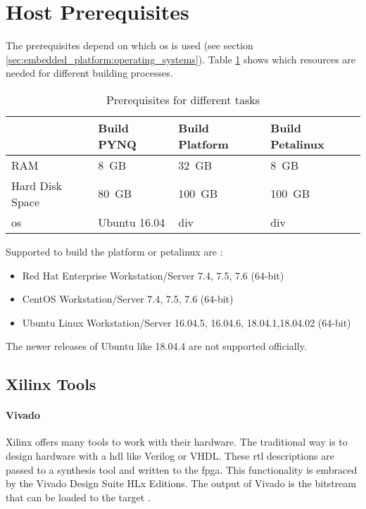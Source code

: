 \section{Host Prerequisites}
\label{sec:embedded_platform:host_prerequisites}

The prerequisites depend on which \acrshort{os} is used (see section \ref{sec:embedded_platform:operating_systems}).
Table \ref{tab:prerequisits_hardware} shows which resources are needed for different building processes. 

\begin{table}[hb]
  \caption{Prerequisites for different tasks}
  \label{tab:prerequisits_hardware}
  \centering
  \begin{tabular}{llll} %
    \toprule
    \textbf{} & \textbf{Build PYNQ} \cite{avnet_pynq_github} & \textbf{Build Platform} \cite{vitis_user_guide} & \textbf{Build Petalinux} \cite{petalinux_user_guide} \\ %
    \midrule
    RAM & \SI{8}{GB} & \SI{32}{GB} & \SI{8}{GB} \\ %
    Hard Disk Space & \SI{80}{GB} & \SI{100}{GB} & \SI{100}{GB} \\ %
    \acrlong{os} & Ubuntu 16.04 & div & div \\ %
    \bottomrule
  \end{tabular}
\end{table}

Supported  to build the platform or petalinux are \cite{vitis_user_guide} \cite{petalinux_user_guide}:
\begin{itemize}
  \item Red Hat Enterprise Workstation/Server 7.4, 7.5, 7.6 (64-bit)
  \item CentOS Workstation/Server 7.4, 7.5, 7.6 (64-bit)
  \item Ubuntu Linux Workstation/Server 16.04.5, 16.04.6, 18.04.1,18.04.02 (64-bit)
\end{itemize}
The newer releases of Ubuntu like 18.04.4 are not supported officially.

\subsection{Xilinx Tools}
\paragraph{Vivado}
\label{subsec:embedded_platform:host_prerequisites:xilinx_tools}
Xilinx offers many tools to work with their hardware.
The traditional way is to design hardware with a \acrfull{hdl} like Verilog or VHDL.
These \acrfull{rtl} descriptions are passed to a synthesis tool and written to the \acrshort{fpga}.
This functionality is embraced by the Vivado Design Suite HLx Editions.
The output of Vivado is the bitstream that can be loaded to the target \cite{vivado_user_guide}.

